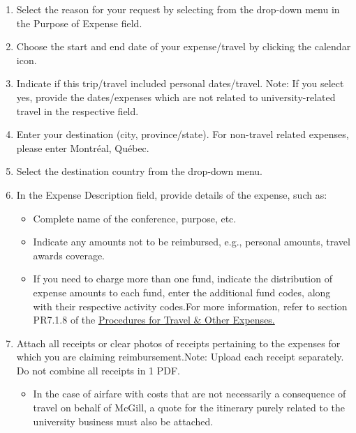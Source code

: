 \begin{enumerate}[leftmargin=10pt]
        \item Select the reason for your request by selecting from the drop-down menu in the Purpose of Expense field.\\
    
        \item Choose the start and end date of your expense/travel by clicking the calendar icon.\\
    
        \item Indicate if this trip/travel included personal dates/travel. Note: If you select yes, provide the dates/expenses which are not related to university-related travel in the respective field.\\
    
        \item Enter your destination (city, province/state). For non-travel related expenses, please enter Montr\'eal, Qu\'ebec.\\
    
       \item Select the destination country from the drop-down menu.\\

       \item In the Expense Description field, provide details of the expense, such as:
    \begin{itemize}
        \item Complete name of the conference, purpose, etc.
        \item Indicate any amounts not to be reimbursed, e.g., personal amounts, travel awards coverage.
        \item If you need to charge more than one fund, indicate the distribution of expense amounts to each fund, enter the additional fund codes, along with their respective activity codes.For more information, refer to section PR7.1.8 of the \href{https://www.mcgill.ca/financialservices/policies/reimburse/procedures}{Procedures for Travel \& Other Expenses.}\\
    \end{itemize}

        \item Attach all receipts or clear photos of receipts pertaining to the expenses for which you are claiming reimbursement.Note: Upload each receipt separately. Do not combine all receipts in 1 PDF.
    
    \begin{itemize}
        \item In the case of airfare with costs that are not necessarily a consequence of travel on behalf of McGill, a quote for the itinerary purely related to the university business must also be attached.\\
    \end{itemize}


\end{enumerate}

